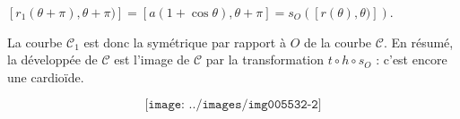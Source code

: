 {\begin{enumerate}
{\begin{center}
$[r_1(\theta+\pi),\theta+\pi)]=[a(1+\cos\theta),\theta+\pi]=s_O([r(\theta),\theta)])$.
\end{center}
La courbe $\mathcal{C}_1$ est donc la symétrique par rapport à $O$ de la courbe $\mathcal{C}$. En résumé, la développée de $\mathcal{C}$ est l'image de $\mathcal{C}$ par la transformation $t\circ h\circ s_O$ : c'est encore une cardioïde.

$$\texttt{[image: ../images/img005532-2]}$$}
\end{enumerate}
}